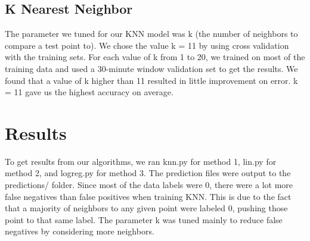 \documentclass[11pt,a4paper]{article}
\begin{document}
\subsection{K Nearest Neighbor}
The parameter we tuned for our KNN model was k (the number of neighbors to compare a test point to). We chose the value k = 11 by using cross validation with the training sets. For each value of k from 1 to 20, we trained on most of the training data and used a 30-minute window validation set to get the results. We found that a value of k higher than 11 resulted in little improvement on error. k = 11 gave us the highest accuracy on average.

\section{Results}
To get results from our algorithms, we ran knn.py for method 1, lin.py for method 2, and logreg.py for method 3. The prediction files were output to the predictions/ folder. Since most of the data labels were 0, there were a lot more false negatives than false positives when training KNN. This is due to the fact that a majority of neighbors to any given point were labeled 0, pushing those point to that same label. The parameter k was tuned mainly to reduce false negatives by considering more neighbors.
\end{document}
